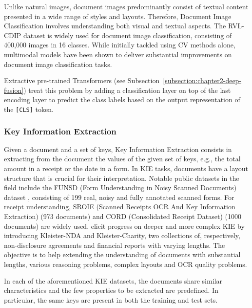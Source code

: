 Unlike natural images, document images predominantly consist of textual content presented in a wide range of styles and layouts. Therefore, Document Image Classification involves understanding both visual and textual aspects. The RVL-CDIP dataset \citep{harley2015evaluation} is widely used for document image classification, consisting of 400,000 images in 16 classes. While initially tackled using \ac{CV} methods alone, multimodal models have been shown to deliver substantial improvements \citep{powalski2021going, huang2022layoutlmv3} on document image classification tasks.

Extractive pre-trained Transformers (see Subsection~\ref{subsection:chapter2-deep-fusion}) treat this problem by adding a classification layer on top of the last encoding layer to predict the class labels based on the output representation of the \texttt{[CLS]} token.

\subsubsection{Key Information Extraction}


Given a document and a set of keys, Key Information Extraction consists in extracting from the document the values of the given set of keys, e.g., the total amount in a receipt or the date in a form. In \ac{KIE} tasks, documents have a layout structure that is crucial for their interpretation. Notable public datasets in the field include the FUNSD (Form Understanding in Noisy Scanned Documents) dataset \citep{jaume2019funsd}, consisting of 199 real, noisy and fully annotated scanned forms. For receipt understanding, SROIE (Scanned Receipts OCR And Key Information Extraction) \citep{huang2019icdar2019} (973 documents) and CORD (Consolidated Receipt Dataset) \citep{park2019cord} (1000 documents) are widely used. \citet{gralinski2020kleister} elicit progress on deeper and more complex \ac{KIE} by introducing Kleister-NDA and Kleister-Charity, two collections of, respectively, non-disclosure agreements and financial reports with varying lengths. The objective is to help extending the understanding of documents with substantial lengths, various reasoning problems, complex layouts and OCR quality problems.

In each of the aforementioned \ac{KIE} datasets, the documents share similar characteristics and the few properties to be extracted are predefined. In particular, the same keys are present in both the training and test sets. 

